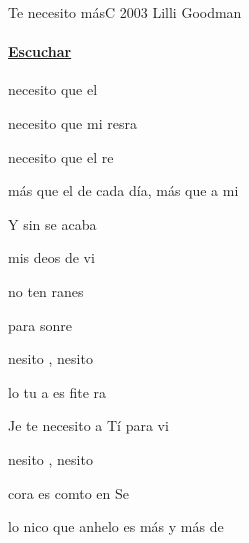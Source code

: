 \documentclass[12pt, spanish]{book}
\newcommand{\NotCCLIed}{\relax}
\begin{document}
    \begin{song}{Te necesito más}{C}
    {2003} %
    {Lilli Goodman}
    {} %
    {} %
        \ifChordBk
            \paragraph{\mbox{}\hfill\protect\href{https://open.spotify.com/intl-es/track/6w8xhvfcZKL7QYOED4jc9L}{Escuchar}\mbox{}\hfill}
        \fi


        \begin{SBOpGroup}
             necesito  que el 

             necesito  que mi resra

             necesito  que el re

            más que el  de cada día, más que a mi 
        \end{SBOpGroup}

        \begin{SBOpGroup}
            Y sin  se acaba

            mis deos de vi

            no ten ranes

            para sonre
        \end{SBOpGroup}

        \begin{SBChorus}
             nesito ,  nesito 

            lo tu a es fite ra 

            Je te necesito a Tí para vi

             nesito ,  nesito 

             cora es comto en  Se

            lo nico que anhelo es más y más de 
        \end{SBChorus}


\end{song}
\end{document}
